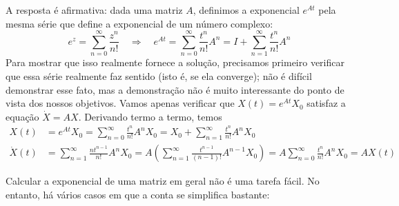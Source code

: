 \documentclass[12pt,a4paper,oneside]{memoir}
\begin{document}
A resposta é afirmativa: dada uma matriz $A$, definimos a exponencial $e^{At}$ pela mesma série que define a exponencial de um número complexo:
\begin{equation}
  e^z = \sum_{n=0}^{\infty} \frac{z^n}{n!} \quad\Rightarrow\quad
  e^{At} = \sum_{n=0}^{\infty} \frac{t^n}{n!} A^n = I + \sum_{n=1}^{\infty} \frac{t^n}{n!} A^n
\end{equation}
Para mostrar que isso realmente fornece a solução, precisamos primeiro verificar que essa série realmente faz sentido (isto é, se ela converge); não é difícil demonstrar esse fato, mas a demonstração não é muito interessante do ponto de vista dos nossos objetivos.  Vamos apenas verificar que $X(t) = e^{At} X_0$ satisfaz a equação $\dot{X} = AX$.  Derivando termo a termo, temos
\begin{align*}
  X(t)
    &= e^{At} X_0
    = \sum_{n=0}^{\infty} \frac{t^n}{n!} A^n X_0
    = X_0 + \sum_{n=1}^{\infty} \frac{t^n}{n!} A^n X_0 \\
  \dot{X}(t)
    &= \sum_{n=1}^{\infty} \frac{n t^{n-1}}{n!} A^n X_0
    = A \left( \sum_{n=1}^{\infty} \frac{t^{n-1}}{(n-1)!} A^{n-1} X_0 \right)
    = A \sum_{n=0}^{\infty} \frac{t^n}{n!} A^n X_0 = A X(t)
\end{align*}

Calcular a exponencial de uma matriz em geral não é uma tarefa fácil.  No entanto, há vários casos em que a conta se simplifica bastante:
\end{document}
